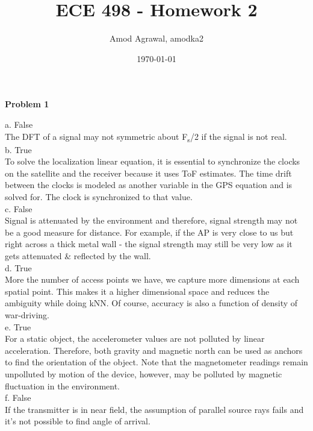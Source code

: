 \documentclass[a4paper]{article}
\title{ECE 498 - Homework 2}
\author{Amod Agrawal, amodka2}
\date{\today}
\begin{document}
\maketitle

\hfill \newline
\textbf{Problem 1}\\ 
\newline \hfill

a. False\\
The DFT of a signal may not symmetric about F\textsubscript{s}/2 if the signal is not real. \\

b. True\\
To solve the localization linear equation, it is essential to synchronize the clocks on the satellite and the receiver because it uses ToF estimates. The time drift between the clocks is modeled as another variable in the GPS equation and is solved for. The clock is synchronized to that value.\\

c. False\\
Signal is attenuated by the environment and therefore, signal strength may not be a good measure for distance. For example, if the AP is very close to us but right across a thick metal wall - the signal strength may still be very low as it gets attenuated \& reflected by the wall.\\

d. True\\
More the number of access points we have, we capture more dimensions at each spatial point. This makes it a higher dimensional space and reduces the ambiguity while doing kNN. Of course, accuracy is also a function of density of war-driving.  \\

e. True\\
For a static object, the accelerometer values are not polluted by linear acceleration. Therefore, both gravity and magnetic north can be used as anchors to find the orientation of the object. Note that the magnetometer readings remain unpolluted by motion of the device, however, may be polluted by magnetic fluctuation in the environment.  \\

f. False\\
If the transmitter is in near field, the assumption of parallel source rays fails and it's not possible to find angle of arrival.  \\
\end{document}
